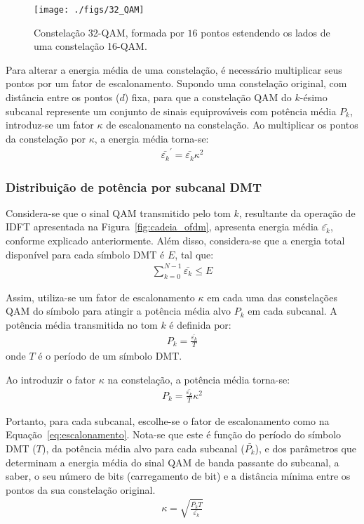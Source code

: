 \begin{figure}[htbp]
\centering
\texttt{[image: ./figs/32\_QAM]}
\caption{Constelação 32-QAM, formada por $16$ pontos estendendo os lados de uma constelação 16-QAM.
\label{fig:32_qam}}
\end{figure}

Para alterar a energia média de uma constelação, é necessário multiplicar seus pontos por um  fator de escalonamento. Supondo uma constelação original, com distância entre os pontos ($d$) fixa, para que a constelação QAM do $k$-ésimo subcanal represente um conjunto de sinais equiprováveis com potência média $P_k$, introduz-se um fator $\kappa$ de escalonamento na constelação. Ao multiplicar os pontos da constelação por $\kappa$, a energia média torna-se:
\begin{align}
\bar{\varepsilon_k}^\prime = \bar{\varepsilon_k} \kappa^2
\end{align}

\subsubsection{Distribuição de potência por subcanal DMT}

Considera-se que o sinal QAM transmitido pelo tom $k$, resultante da operação de IDFT apresentada na Figura~\ref{fig:cadeia_ofdm}, apresenta energia média $\bar{\varepsilon_k}$, conforme explicado anteriormente. Além disso, considera-se que a energia total disponível para cada símbolo DMT é $E$, tal que:
\begin{align}
\sum \limits_{k=0}^{N-1} \bar{\varepsilon_k} \leq E
\label{eq:energy_distribution}
\end{align}

Assim, utiliza-se um fator de escalonamento $\kappa$ em cada uma das constelações QAM do símbolo para atingir a potência média alvo $P_k$ em cada subcanal. A potência média transmitida no tom $k$ é definida por:
\begin{align}
P_k = \frac{\bar{\varepsilon_k}}{T}
\label{eq:power_QAM_k}
\end{align}
onde $T$ é o período de um símbolo DMT.

Ao introduzir o fator $\kappa$ na constelação, a potência média torna-se:
\begin{align}
P_k = \frac{\bar{\varepsilon_k}}{T}\kappa^2
\end{align}

Portanto, para cada subcanal, escolhe-se o fator de escalonamento como na Equação~\ref{eq:escalonamento}. Nota-se que este é função do período do símbolo DMT ($T$), da potência média alvo para cada subcanal ($\bar{P_k}$), e dos parâmetros que determinam a energia média do sinal QAM de banda passante do subcanal, a saber, o seu número de bits (carregamento de bit) e a distância mínima entre os pontos da sua constelação original. 
\begin{align}
\kappa = \sqrt{ \frac{\bar{P_k} T }{  \bar{\varepsilon_k} } }
\label{eq:escalonamento}
\end{align}

